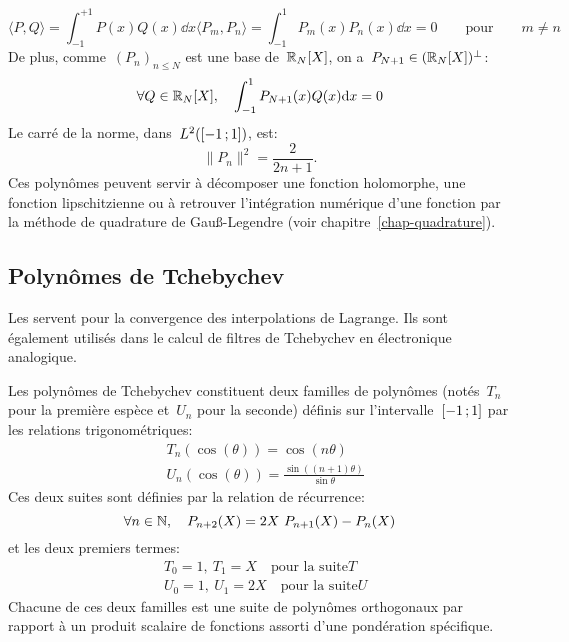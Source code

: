 \begin{equation}
\langle P,Q\rangle= \int_{-1}^{+1} P(x) Q(x)\dd x \langle P_m,P_n\rangle= \int_{-1}^{1} P_m(x)P_n(x)\dd x = 0\qquad \mathrm{pour}\qquad m \ne n 
\end{equation}
De plus, comme~$(P_n)_{n\leq N}$ est une base de~$\mathbb R_N[X]$, on a~$P_{N+1} \in (\mathbb R_N[X])^\bot$: 
\begin{equation}
\forall Q \in \mathbb R_N[X],\quad \int_{-1}^{1} P_{N+1}(x)Q(x)\text{d} x = 0 
\end{equation}
Le carré de la norme, dans~$L^2(\mathopen{[}-1\,;1\mathclose{]})$, est: 
\begin{equation}
 \|P_n\|^2=\frac{2}{2n+1}. 
\end{equation}
Ces polynômes peuvent servir à décomposer une fonction holomorphe, une fonction lipschitzienne ou à retrouver l'intégration numérique d'une fonction par la méthode de quadrature de Gauß-Legendre (voir chapitre~\ref{chap-quadrature}). 
\subsection{Polynômes de Tchebychev} 
Les  servent pour la convergence des interpolations de Lagrange. Ils sont également utilisés dans le calcul de filtres de Tchebychev en électronique analogique. 

Les polynômes de Tchebychev constituent deux familles de polynômes (notés~$T_n$ pour la première espèce et~$U_n$ pour la seconde) définis sur l'intervalle~$\mathopen{[}-1\,;1\mathclose{]}$ par les relations trigonométriques: 
\begin{align}
&T_n(\cos(\theta))=\cos(n\theta)\\
&U_n(\cos(\theta))=\frac{\sin((n+1) \theta)}{\sin \theta} 
\end{align}
Ces deux suites sont définies par la relation de récurrence: 
\begin{equation}
\forall n\in\mathbb N,\quad P_{n+2}(X)=2X~P_{n+1}(X)-P_n(X) 
\end{equation}
et les deux premiers termes: 
\begin{align}
&T_0=1,~T_1=X \quad \text{pour la suite} T\\
&U_0=1,~U_1=2X \quad \text{pour la suite} U 
\end{align}
Chacune de ces deux familles est une suite de polynômes orthogonaux par rapport à un produit scalaire de fonctions assorti d'une pondération spécifique. 
